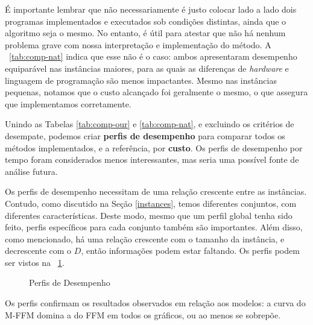\documentclass{MO824}
\begin{document}
É importante lembrar que não necessariamente é justo colocar lado a lado dois programas implementados e executados sob condições distintas, ainda que o algoritmo seja o mesmo. No entanto, é útil para atestar que não há nenhum problema grave com nossa interpretação e implementação do método. A \tablename~\ref{tab:comp-nat} indica que esse não é o caso: ambos apresentaram desempenho equiparável nas instâncias maiores, para as quais as diferenças de \textit{hardware} e linguagem de programação são menos impactantes. Mesmo nas instâncias pequenas, notamos que o custo alcançado foi geralmente o mesmo, o que assegura que implementamos corretamente. 


Unindo as Tabelas \ref{tab:comp-our} e \ref{tab:comp-nat}, e excluindo os critérios de desempate, podemos criar \textbf{perfis de desempenho} \cite{pp} para comparar todos os métodos implementados, e a referência, por \textbf{custo}. Os perfis de desempenho por tempo foram considerados menos interessantes, mas seria uma possível fonte de análise futura.

Os perfis de desempenho necessitam de uma relação crescente entre as instâncias. Contudo, como discutido na Seção \ref{instances}, temos diferentes conjuntos, com diferentes características. Deste modo, mesmo que um perfil global tenha sido feito, perfis específicos para cada conjunto também são importantes. Além disso, como mencionado, há uma relação crescente com o tamanho da instância, e decrescente com o $D$, então informações podem estar faltando. Os perfis podem ser vistos na \figurename~\ref{fig:pp}.

\begin{figure}[ht]
    \centering
    \qquad
    \caption{Perfis de Desempenho}
    \label{fig:pp}
\end{figure}

Os perfis confirmam os resultados observados em relação aos modelos: a curva do M-FFM domina a do FFM em todos os gráficos, ou ao menos se sobrepõe.
\end{document}
